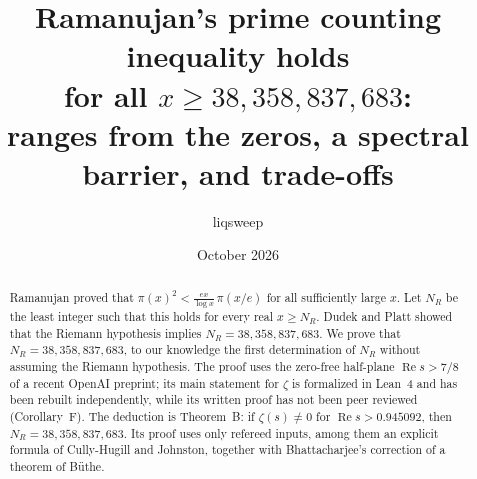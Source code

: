 \documentclass{amsart}
\theoremstyle{definition}
\theoremstyle{remark}
\theoremstyle{plain}
\numberwithin{equation}{section}
\newcommand{\NN}{38{,}358{,}837{,}683}
\newcommand{\thetaB}{0.945092}
\begin{document}
\title[Ramanujan's prime counting inequality]{Ramanujan's prime counting inequality holds\\ for all $x\ge38{,}358{,}837{,}683$:\\ ranges from the zeros, a spectral barrier, and trade-offs}

\DeclareRobustCommand{\authorhandle}{liqsweep}
\author{\authorhandle}
\address{X: \texttt{@liqsweep}}

\date{October 2026}

\begin{abstract}
Ramanujan proved that $\pi(x)^2<\frac{ex}{\log x}\,\pi(x/e)$ for all sufficiently large $x$. Let $N_R$ be the least integer such that this holds for every real $x\ge N_R$. Dudek and Platt showed that the Riemann hypothesis implies $N_R=\NN$. We prove that $N_R=\NN$, to our knowledge the first determination of $N_R$ without assuming the Riemann hypothesis. The proof uses the zero-free half-plane $\operatorname{Re}s>7/8$ of a recent OpenAI preprint; its main statement for $\zeta$ is formalized in Lean~4 and has been rebuilt independently, while its written proof has not been peer reviewed (Corollary~F). The deduction is Theorem~B: if $\zeta(s)\ne0$ for $\operatorname{Re}s>\thetaB$, then $N_R=\NN$. Its proof uses only refereed inputs, among them an explicit formula of Cully-Hugill and Johnston, together with Bhattacharjee's correction of a theorem of B\"uthe.


\end{abstract}
\end{document}
